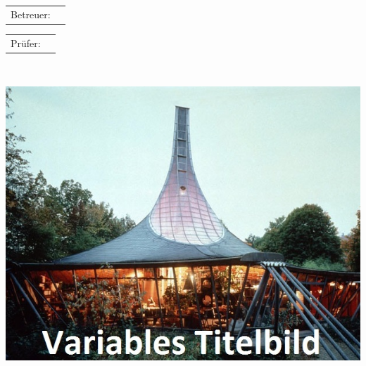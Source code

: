 \begin{titlepage}
\begin{minipage}[c]{105mm}
		\vspace{5mm}
		\hspace{-3.0mm} 
		\begin{tabular}{p{2.5cm}l}
			\textsf{Betreuer:}&\textsf{\Betreuer} \\ 
		\end{tabular}
		
		\vspace{5mm}
		\hspace{-3.0mm} 
		\begin{tabular}{p{2.5cm}l}
			\textsf{Prüfer:}&\textsf{\Pruefer}	\\
		\end{tabular}
		
		\vspace{11mm}
		\textsf{\EndeMonat~\EndeJahr}
		
		\begin{minipage}[t][10.5cm][c]{\textwidth}
			\includegraphics[width=1.0\textwidth]{Titelbild.jpg}
		\end{minipage}
		
		\vspace{10mm}
		

\end{minipage}
\end{titlepage}

